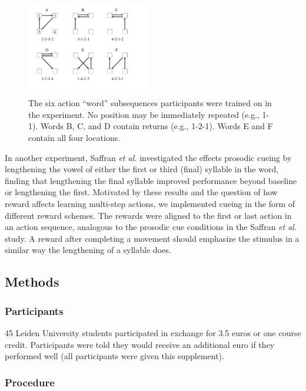 \documentclass[conference]{IEEEtran}
\begin{document}
\begin{figure}[h]
  \centering
  \includegraphics[width=0.48\textwidth]{figures/exp2_words}
  \caption{The six action ``word'' subsequences participants were trained on in the experiment. No position may be immediately repeated (e.g., 1-1). Words B, C, and D contain returns (e.g., 1-2-1). Words E and F contain all four locations.}
  \label{fig:exp2words}
\end{figure} 

In another experiment, Saffran \textit{et al.} investigated the effects prosodic cueing by lengthening the vowel of either the first or third (final) syllable in the word, finding that lengthening the final syllable improved performance beyond baseline or lengthening the first. Motivated by these results and the question of how reward affects learning multi-step actions, we implemented cueing in the form of different reward schemes. The rewards were aligned to the first or last action in an action sequence, analogous to the prosodic cue conditions in the Saffran \textit{et al.} study. A reward after completing a movement should emphasize the stimulus in a similar way the lengthening of a syllable does.

\subsection{Methods}

\subsubsection{Participants}

45 Leiden University students participated in exchange for 3.5 euros or one course credit. Participants were told they would receive an additional euro if they performed well (all participants were given this supplement).

\subsubsection{Procedure}
\end{document}
